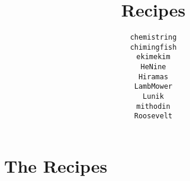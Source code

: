 \documentclass[12pt,a4paper,twoside]{book}
\title{Recipes}
\author{\texttt{chemistring}\\%
		\texttt{chimingfish}\\%
		\texttt{ekimekim}\\%
		\texttt{HeNine}\\%
		\texttt{Hiramas}\\%
		\texttt{LambMower}\\%
		\texttt{Lunik}\\%
		\texttt{mithodin}\\%
		\texttt{Roosevelt}
}
\begin{document}
	\maketitle
	\tableofcontents
	\clearpage

	\chapter{The Recipes}

	
    \clearpage
	
    \clearpage
    
	\clearpage
	
	\clearpage
	
    \clearpage
    
	\clearpage
	
	\clearpage
	
	\clearpage
	
	\clearpage
	
	\clearpage
	
	\clearpage
	
	\clearpage
	
	\clearpage
	
	\clearpage
	
	\clearpage
	
	\clearpage
	
	\clearpage
	
	\clearpage
	
	\clearpage
	
	\clearpage
	
	\clearpage
	
	\clearpage
	
\end{document}
